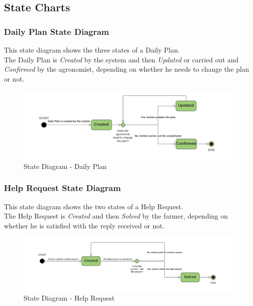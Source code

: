 \subsection{State Charts}

\subsubsection{Daily Plan State Diagram}
This state diagram shows the three states of a Daily Plan.\\
The Daily Plan is \textit{Created} by the system and then \textit{Updated} or carried out and \textit{Confirmed} by the agronomist, depending on whether he needs to change the plan or not.
\begin{figure}[h!]
  \includegraphics[width=\textwidth,height=\textheight,keepaspectratio]{./Images/State Chart DailyPlan.png}
  \caption{State Diagram - Daily Plan}
\end{figure}

\subsubsection{Help Request State Diagram}
This state diagram shows the two states of a Help Request.\\
The Help Request is \textit{Created} and then \textit{Solved} by the farmer, depending on whether he is satisfied with the reply received or not.
\begin{figure}[h!]
  \includegraphics[width=\textwidth,height=\textheight,keepaspectratio]{./Images/State Chart HelpRequest.png}
  \caption{State Diagram - Help Request}
\end{figure}

